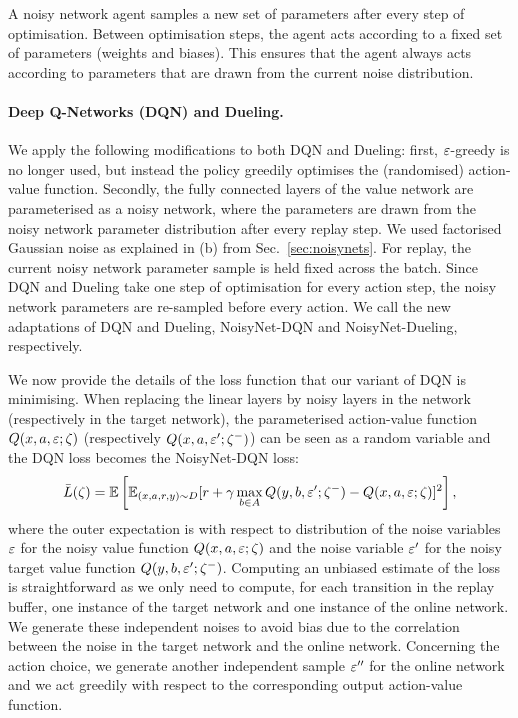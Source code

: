 \documentclass{article}
\newcommand{\algoinit}{NoisyNet}
\begin{document}
A noisy network agent samples a new set of parameters after every step of optimisation.
Between optimisation steps, the agent acts according to a fixed set of parameters (weights and biases).
This ensures that the agent always acts according to parameters that are drawn from the current noise distribution.


\paragraph{Deep Q-Networks (DQN) and Dueling.}
We apply the following modifications to both  DQN and Dueling: first, $\varepsilon$-greedy is no longer used, but instead the policy greedily optimises the (randomised) action-value function.
Secondly, the fully connected layers of the value network are parameterised as a noisy network, where the parameters are drawn from the noisy network parameter distribution after every replay step. We used factorised Gaussian noise as explained in (b) from Sec.~\ref{sec:noisynets}.
For replay, the current noisy network parameter sample is held fixed across the batch.
Since DQN and Dueling take one step of optimisation for every action step, the noisy network parameters are re-sampled before every action.
We call the new adaptations  of DQN and Dueling, \algoinit{}-DQN and \algoinit{}-Dueling, respectively.

We now provide the details of the loss function that our variant of DQN is minimising.  When replacing the linear layers by noisy layers in the network (respectively in the target network), the parameterised action-value function $Q(x,a,\varepsilon;\zeta)$ (respectively $Q(x,a,\varepsilon';\zeta^-)$) can be seen as a random variable and the DQN loss becomes the \algoinit{}-DQN loss:
 \begin{equation}
 \bar L(\zeta)=\mathbb{E}\left[\mathbb{E}_{(x,a,r,y)\sim D}[r+ \gamma \max_{b\in A}Q(y,b,\varepsilon';\zeta^-)-Q(x,a,\varepsilon;\zeta)]^2\right],
 \label{eq:Noisy.DQN.loss}
 \end{equation}
\noindent where the outer expectation is with respect to distribution of the noise variables $\varepsilon$ for the noisy value function $Q(x,a,\varepsilon;\zeta)$ and the noise variable $\varepsilon'$ for the noisy target value function $Q(y,b,\varepsilon';\zeta^-)$.
 Computing an unbiased estimate of the loss is straightforward as we only need to compute, for each transition in the replay buffer, one instance of the target network and one instance of the online network. We generate these independent noises to avoid bias due to the correlation between the noise in the target network and the online network. Concerning the action choice, we generate another independent sample  $\varepsilon''$ for the online network and we act greedily with respect to the corresponding  output action-value function. 
\end{document}
